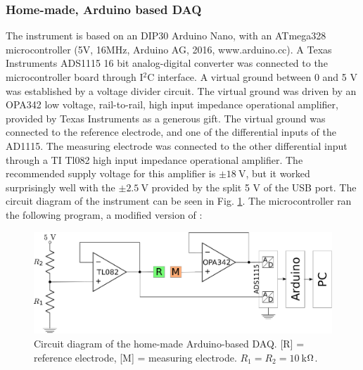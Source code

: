 \subsubsection{Home-made, Arduino based DAQ}

The instrument is based on an DIP30 Arduino Nano, with an ATmega328 microcontroller (5V, 16MHz, Arduino AG, 2016, www.arduino.cc). A Texas Instruments ADS1115 16 bit analog-digital converter was connected to the microcontroller board through I$^2$C interface. A virtual ground between 0 and 5 V was established by a voltage divider circuit. The virtual ground was driven by an OPA342 low voltage, rail-to-rail, high input impedance operational amplifier, provided by Texas Instruments as a generous gift. The virtual ground was connected to the reference electrode, and one of the differential inputs of the AD1115. The measuring electrode was connected to the other differential input through a TI Tl082 high input impedance operational amplifier. The recommended supply voltage for this amplifier is $\pm 18~$V, but it worked surprisingly well with the $\pm 2.5~$V provided by the split 5 V of the USB port. The circuit diagram of the instrument can be seen in Fig. \ref{fig:daq_circuit}. The microcontroller ran the following program, a modified version of \cite{ads}: 

\begin{figure}
\centering
% 
%
%
\includegraphics[width=1\textwidth]{img/arduino.eps}
\caption[Circuit diagram of the home-made Arduino-based DAQ.]{Circuit diagram of the home-made Arduino-based DAQ. [R] = reference electrode, [M] = measuring electrode. $R_1 = R_2 = 10~$k$\ohm$.}
\label{fig:daq_circuit}
\end{figure}

